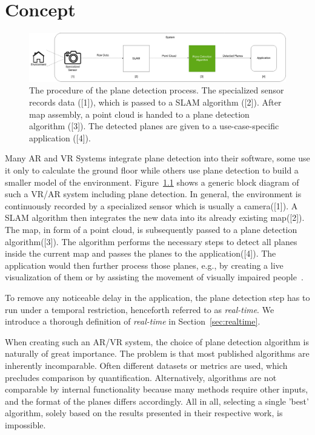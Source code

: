 \documentclass[main.tex]{subfiles}
\begin{document}
\chapter{Concept} \label{chap:Concept}


\begin{figure}[H]
    \centering
    \includegraphics[width=15 cm]{images/concept_specific.png}
    \caption[AR/VR System Overview]{The procedure of the plane detection process. The specialized sensor records data ([1]), which is passed to
        a SLAM algorithm ([2]). After map assembly, a point cloud is handed to a plane detection algorithm ([3]).
        The detected planes are given to a use-case-specific application ([4]).}
    \label{fig:concept}
\end{figure}

Many AR and VR Systems integrate plane detection into their software, some use it only to calculate the ground floor while others use plane detection to
build a smaller model of the environment.
Figure~\ref{fig:concept} shows a generic block diagram of such a VR/AR system including plane detection.
In general, the environment is continuously recorded by a specialized sensor which is usually a camera([1]). A SLAM algorithm then integrates the new data into its already existing map([2]). The map, in form of a point cloud,
is subsequently passed to a plane detection algorithm([3]). The algorithm performs the necessary steps to detect all planes inside the current map and passes the planes to the application([4]).
The application would then further process those planes, e.g., by creating a live visualization of them or by assisting the movement of visually impaired people~\cite{Carranza_Estrella_Zaidi_Carranza_2021}.

To remove any noticeable delay in the application, the plane detection step has to run under a temporal restriction, henceforth referred to as \textit{real-time}.
We introduce a thorough definition of \textit{real-time} in Section~\ref{sec:realtime}.

When creating such an AR/VR system, the choice of plane detection algorithm is naturally of great importance. The problem is that most published algorithms are inherently incomparable.
Often different datasets or metrics are used, which precludes comparison by quantification.
Alternatively, algorithms are not comparable by internal functionality because many methods require other inputs, and the format of the planes differs accordingly.
All in all, selecting a single 'best' algorithm, solely based on the results presented in their respective work, is impossible.
\end{document}
